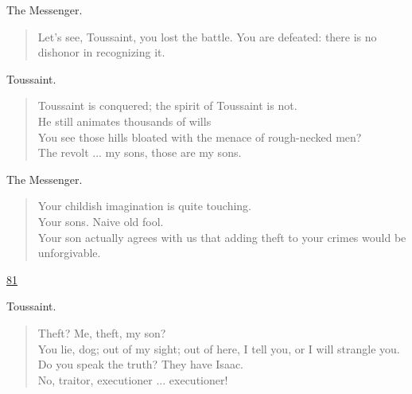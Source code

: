 \documentclass[letterpaper,article,12pt,oneside,notitlepage]{memoir}
\begin{document}
\begin{center}The Messenger.\end{center}

\begin{verse}
Let's see, Toussaint, you lost the battle. You are defeated: there is no dishonor in recognizing it. \\
\end{verse}

\begin{center}Toussaint.\end{center}

\begin{verse}
Toussaint is conquered; the spirit of Toussaint is not. \\
He still animates thousands of wills \\
You see those hills bloated with the menace of rough-necked men? \\
The revolt ... my sons, those are my sons. \\
\end{verse}

\begin{center}The Messenger.\end{center}

\begin{verse}
\hspace{1cm} Your childish imagination is quite touching. \\
Your sons. Naive old fool. \\
Your son actually agrees with us that adding theft to your crimes would be unforgivable. \\
\end{verse}

\clearpage

\href{http://cesaire.elotroalex.com/chiens/chiens/p081.html}{81}

\begin{center}Toussaint.\end{center}

\begin{verse}
Theft? Me, theft, my son? \\
You lie, dog; out of my sight; out of here, I tell you, or I will strangle you. \\
Do you speak the truth? They have Isaac. \\
No, traitor, executioner ... executioner! \\
\end{verse}
\end{document}
